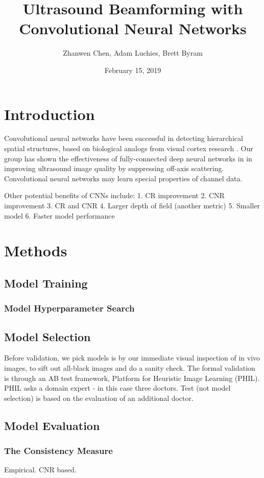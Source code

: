 \documentclass{article}
\title{Ultrasound Beamforming with Convolutional Neural Networks}
\author{Zhanwen Chen, Adam Luchies, Brett Byram}
\affil{Vanderbilt University}
\date{February 15, 2019}
\begin{document}
\maketitle

\section{Introduction}

Convolutional neural networks have been successful in detecting hierarchical
spatial structures, based on biological analogs from visual cortex research \cite{??}.
Our group has shown the effectiveness of fully-connected
deep neural networks in \cite{???} in improving ultrasound image quality by
suppressing off-axis scattering. Convolutional neural networks may learn special
properties of channel data.

Other potential benefits of CNNs include:
1. CR improvement
2. CNR improvement
3. CR and CNR
4. Larger depth of field (another metric)
5. Smaller model
6. Faster model performance


\section{Methods}
\subsection{Model Training}
\subsubsection{Model Hyperparameter Search}

\subsection{Model Selection}
Before validation, we pick models is by our immediate visual inspection of
in vivo images, to sift out all-black images and do a sanity check. The formal
validation is through an A\/B test framework, Platform for Heuristic Image Learning (PHIL). PHIL asks a domain expert - in this case three doctors. Test (not model selection) is based on the evaluation of an additional doctor.

\subsection{Model Evaluation}
\subsubsection{The Consistency Measure}
Empirical. CNR based.
\end{document}
